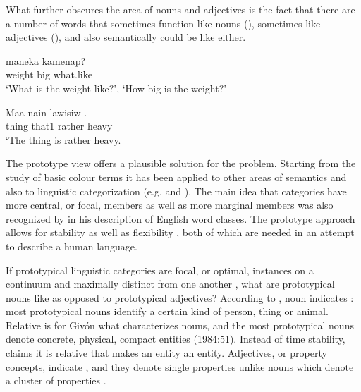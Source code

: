 What further obscures the area of nouns and adjectives is the fact that there are a number of words that sometimes function like nouns (), sometimes like adjectives (), and also semantically could be like either.

\ea%
\label{ex:x20}
\gll {} maneka kamenap? \\
weight big what.like\\
\glt`What is the weight like?', `How big is the weight?'
\z

\ea%
\label{ex:x21}
\gll Maa nain lawisiw . \\
thing that1 rather heavy\\
\glt`The thing is rather heavy.
\z

The prototype view offers a plausible solution for the problem. Starting from the study of basic colour terms \citep{BerlinEtAl1969} it has been applied to other areas of semantics and also to linguistic categorization (e.g.\citealt{Wierzbicka1986,Taylor1989} and \citealt{Frawley1992}). The main idea that categories have more central, or focal, members as well as more marginal members was also recognized by \citet{Crystal1967} in his description of English word classes. The prototype approach allows for stability as well as flexibility \citep[53]{Taylor1989}, both of which are needed in an attempt to describe a human language.

If prototypical linguistic categories are focal, or optimal, instances on a continuum \citep[321]{Seiler1978} and maximally distinct from one another \citep[709]{HopperEtAl1984}%
, what are prototypical nouns like as opposed to prototypical adjectives? According to \citet{Wierzbicka1986}, noun indicates : most prototypical nouns identify a certain kind of person, thing or animal. Relative  is for Giv\'on what characterizes nouns, and the most prototypical nouns denote concrete, physical, compact entities (1984:51). Instead of time stability, \citet[66]{Frawley1992} claims it is relative \textstyleEmphasizedWords{} that makes an entity an entity. Adjectives, or property concepts, indicate , and they denote single properties unlike nouns which denote a cluster of properties \citep{Wierzbicka1986}.


